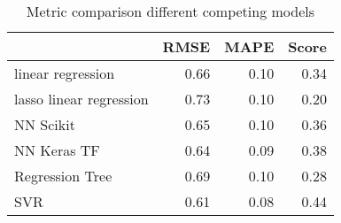 \begin{table}[h!]
\centering
\caption{Metric comparison different competing models}
\label{tab:model_results}
\begin{tabular}{lrrr}
\toprule
{} &  RMSE &  MAPE &  Score \\
\midrule
linear regression       &  0.66 &  0.10 &   0.34 \\
lasso linear regression &  0.73 &  0.10 &   0.20 \\
NN Scikit               &  0.65 &  0.10 &   0.36 \\
NN Keras TF             &  0.64 &  0.09 &   0.38 \\
Regression Tree         &  0.69 &  0.10 &   0.28 \\
SVR                     &  0.61 &  0.08 &   0.44 \\
\bottomrule
\end{tabular}
\end{table}

